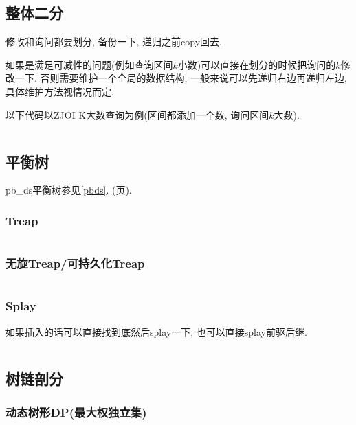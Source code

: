 \documentclass[a4paper, twoside]{article}
\begin{document}
\begin{multicols}{2}
			\subsection{整体二分}
				修改和询问都要划分, 备份一下, 递归之前copy回去.

				如果是满足可减性的问题(例如查询区间$k$小数)可以直接在划分的时候把询问的$k$修改一下. 否则需要维护一个全局的数据结构, 一般来说可以先递归右边再递归左边, 具体维护方法视情况而定.

				以下代码以ZJOI K大数查询为例(区间都添加一个数, 询问区间$k$大数).

				\inputminted{cpp}{../src/datastructure/整体二分.cpp}

	
	
			\subsection{平衡树}
				pb\_ds平衡树参见\ref{pbds}. (\pageref{pbds}页).

				\subsubsection{Treap}
					\inputminted{cpp}{../src/datastructure/Treap.cpp}
					
				\subsubsection{无旋Treap/可持久化Treap}
					\inputminted{cpp}{../src/datastructure/无旋Treap.cpp}
		
				\subsubsection{Splay}
					如果插入的话可以直接找到底然后splay一下, 也可以直接splay前驱后继.
					\inputminted{cpp}{../src/datastructure/文艺平衡树.cpp}
				
			\subsection{树链剖分}
				\subsubsection{动态树形DP(最大权独立集)}
					\inputminted{cpp}{../src/datastructure/动态树形DP.cpp}
				

\end{multicols}
\end{document}
